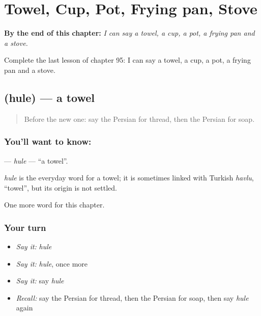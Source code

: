 
\chapter{Towel, Cup, Pot, Frying pan, Stove}
\label{ch:fa-towel-cup-pot-frying-pan-stove}

\begin{chapteropening}
\textbf{By the end of this chapter:} \emph{I can say a towel, a cup, a pot, a frying pan and a stove.}

Complete the last lesson of chapter 95: I can say a towel, a cup, a pot, a frying pan and a stove.
\end{chapteropening}

\section[\texorpdfstring{\fa{حوله} (hule)}{حوله (hule)}]{ (hule) — a towel}

\label{lesson:FA-C95-hule}



\begin{quote}
Before the new one: say the Persian for thread, then the Persian for soap.
\end{quote}

\subsection*{You'll want to know: }
\textbf{} — \emph{hule} — \textquotedblleft{}a towel\textquotedblright{}.

\begin{cousinweb}
\emph{hule} is the everyday word for a towel; it is sometimes linked with Turkish \emph{havlu}, \textquotedblleft{}towel\textquotedblright{}, but its origin is not settled.
\end{cousinweb}

\begin{grammarlens}[title={What you've built}]
One more word for this chapter.
\end{grammarlens}

\subsection*{Your turn}
\begin{itemize}
\raggedright
  \item \emph{Say it:} \emph{hule}
  \item \emph{Say it:} \emph{hule}, once more
  \item \emph{Say it:} say \emph{hule}
  \item \emph{Recall:} say the Persian for thread, then the Persian for soap, then say \emph{hule} again
\end{itemize}

